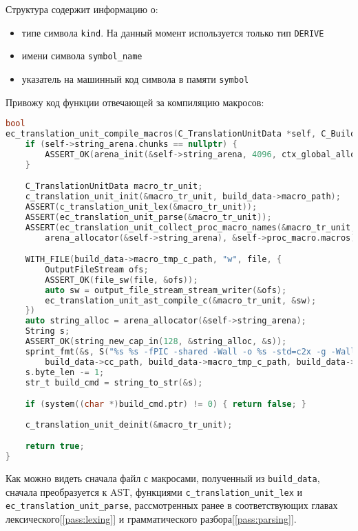 Структура содержит информацию о:
\begin{itemize}
    \item типе символа \verb|kind|. На данный момент используется только тип \verb|DERIVE|
    \item имени символа \verb|symbol_name|
    \item указатель на машинный код символа в памяти \verb|symbol|
\end{itemize}
    
Привожу код функции отвечающей за компиляцию макросов:

\begin{lstlisting}[language=c, caption={Реализация функции компиляции макросов}, label={pass:macros:compile-impl}]
bool
ec_translation_unit_compile_macros(C_TranslationUnitData *self, C_BuildData *build_data) {
    if (self->string_arena.chunks == nullptr) {
        ASSERT_OK(arena_init(&self->string_arena, 4096, ctx_global_alloc));
    }

    C_TranslationUnitData macro_tr_unit;
    c_translation_unit_init(&macro_tr_unit, build_data->macro_path);
    ASSERT(c_translation_unit_lex(&macro_tr_unit));
    ASSERT(ec_translation_unit_parse(&macro_tr_unit));
    ASSERT(ec_translation_unit_collect_proc_macro_names(&macro_tr_unit, 
        arena_allocator(&self->string_arena), &self->proc_macro.macros));

    WITH_FILE(build_data->macro_tmp_c_path, "w", file, {
        OutputFileStream ofs;
        ASSERT_OK(file_sw(file, &ofs));
        auto sw = output_file_stream_stream_writer(&ofs);
        ec_translation_unit_ast_compile_c(&macro_tr_unit, &sw);
    })
    auto string_alloc = arena_allocator(&self->string_arena);
    String s;
    ASSERT_OK(string_new_cap_in(128, &string_alloc, &s));
    sprint_fmt(&s, S("%s %s -fPIC -shared -Wall -o %s -std=c2x -g -Wall -I. -I./lib -L./build -lec\0"), 
        build_data->cc_path, build_data->macro_tmp_c_path, build_data->macro_lib_path);
    s.byte_len -= 1;
    str_t build_cmd = string_to_str(&s);

    if (system((char *)build_cmd.ptr) != 0) { return false; }
    
    c_translation_unit_deinit(&macro_tr_unit);

    return true;
}
\end{lstlisting}

Как можно видеть сначала файл с макросами, полученный из \verb|build_data|, сначала преобразуется к AST, 
функциями \newline\verb|c_translation_unit_lex| и \verb|ec_translation_unit_parse|, 
рассмотренных ранее в соответствующих главах лексического[\ref{pass:lexing}] и грамматического разбора[\ref{pass:parsing}].

